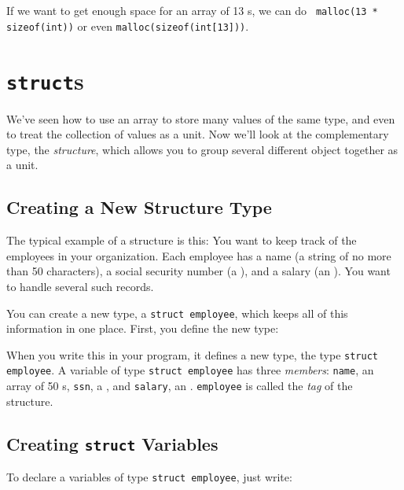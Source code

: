 If we want to get enough space for an array of 13 \int s, we can do {\tt
malloc(13 * sizeof(int))} or even {\tt malloc(sizeof(int[13]))}.    

\section{{\tt struct}s}

We've seen how to use an array to store many values of the same type,
and even to treat the collection of values as a unit.  Now we'll look at
the complementary type, the {\em structure}\/, which allows you to group
several different object together as a unit.

\subsection{Creating a New Structure Type}

The typical example of a structure is this:  You want to keep track of
the employees in your organization.  Each employee has a name (a string
of no more than 50 characters), a social security number (a \longint),
and a salary (an \int).  You want to handle several such records.

You can create a new type, a {\tt struct employee}, which keeps all of
this information in one place.  First, you define the new type:

\begin{flushleft}
\verb% struct employee {% \\*
\verb%   char name[50];% \\*
\verb%   long int ssn;% \\*
\verb%   int salary;% \\*
\verb%} ; % 
\end{flushleft}

When you write this in your program, it defines a new type, the type
{\tt struct employee}.  A variable of type {\tt struct employee} has
three {\em members}\/:  {\tt name}, an array of 50 \chr s, {\tt ssn}, a
\longint, and {\tt salary}, an \int.  
{\tt employee} is called the {\em tag}\/ of the structure.

\subsection{Creating {\tt struct} Variables}

To declare a variables of type {\tt struct employee}, just write:

\begin{flushleft}
\verb% struct employee smithers, marketing[12], *the_employee;% 
\end{flushleft}

